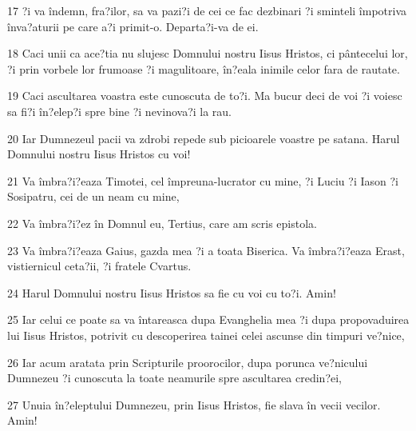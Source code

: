 \par 17 ?i va îndemn, fra?ilor, sa va pazi?i de cei ce fac dezbinari ?i sminteli împotriva înva?aturii pe care a?i primit-o. Departa?i-va de ei.
\par 18 Caci unii ca ace?tia nu slujesc Domnului nostru Iisus Hristos, ci pântecelui lor, ?i prin vorbele lor frumoase ?i magulitoare, în?eala inimile celor fara de rautate.
\par 19 Caci ascultarea voastra este cunoscuta de to?i. Ma bucur deci de voi ?i voiesc sa fi?i în?elep?i spre bine ?i nevinova?i la rau.
\par 20 Iar Dumnezeul pacii va zdrobi repede sub picioarele voastre pe satana. Harul Domnului nostru Iisus Hristos cu voi!
\par 21 Va îmbra?i?eaza Timotei, cel împreuna-lucrator cu mine, ?i Luciu ?i Iason ?i Sosipatru, cei de un neam cu mine,
\par 22 Va îmbra?i?ez în Domnul eu, Tertius, care am scris epistola.
\par 23 Va îmbra?i?eaza Gaius, gazda mea ?i a toata Biserica. Va îmbra?i?eaza Erast, vistiernicul ceta?ii, ?i fratele Cvartus.
\par 24 Harul Domnului nostru Iisus Hristos sa fie cu voi cu to?i. Amin!
\par 25 Iar celui ce poate sa va întareasca dupa Evanghelia mea ?i dupa propovaduirea lui Iisus Hristos, potrivit cu descoperirea tainei celei ascunse din timpuri ve?nice,
\par 26 Iar acum aratata prin Scripturile proorocilor, dupa porunca ve?nicului Dumnezeu ?i cunoscuta la toate neamurile spre ascultarea credin?ei,
\par 27 Unuia în?eleptului Dumnezeu, prin Iisus Hristos, fie slava în vecii vecilor. Amin!


